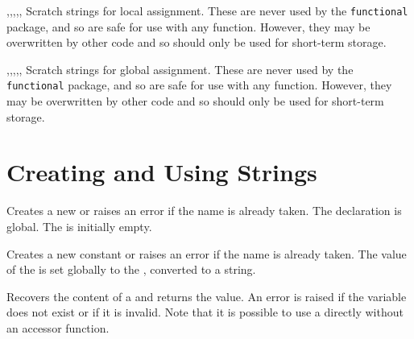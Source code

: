 \documentclass[oneside]{book}
\begin{document}
\begin{variable}{\lTmpaStr,\lTmpbStr,\lTmpcStr,\lTmpiStr,\lTmpjStr,\lTmpkStr}
Scratch strings for local assignment. These are never used by
the \verb!functional! package, and so are safe for use with any
function. However, they may be overwritten by other
code and so should only be used for short-term storage.
\end{variable}

\begin{variable}{\gTmpaStr,\gTmpbStr,\gTmpcStr,\gTmpiStr,\gTmpjStr,\gTmpkStr}
Scratch strings for global assignment. These are never used by
the \verb!functional! package, and so are safe for use with any
function. However, they may be overwritten by other
code and so should only be used for short-term storage.
\end{variable}

\section{Creating and Using Strings}

\begin{function}{\StrNew}
\begin{syntax}
 
\end{syntax}
Creates a new  or raises an error if the name is
already taken. The declaration is global. The  is
initially empty.
\begin{codehigh}
\StrNew \lFooSomeStr
\end{codehigh}
\end{function}

\begin{function}{\StrConst}
\begin{syntax}
  
\end{syntax}
Creates a new constant  or raises an error if the name
is already taken.  The value of the  is set
globally to the , converted to a string.
\begin{codehigh}
\StrConst {}
\end{codehigh}
\end{function}

\begin{function}{\StrUse}
\begin{syntax}
 
\end{syntax}
Recovers the content of a  and returns the value.
An error is raised if the variable
does not exist or if it is invalid. Note that it is possible to use
a  directly without an accessor function.
\begin{codehigh}
\StrUse \lTmpaStr
\end{codehigh}
\end{function}
\end{document}
